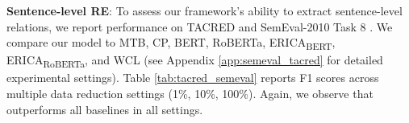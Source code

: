 \textbf{Sentence-level RE}: To assess our framework's ability to extract sentence-level relations, we report performance on TACRED \cite{zhang2017tacred} and SemEval-2010 Task 8 \cite{hendrickx-etal-2010-semeval}. We compare our model to MTB, CP, BERT, RoBERTa, ERICA\textsubscript{BERT}, ERICA\textsubscript{RoBERTa}, and WCL (see Appendix \ref{app:semeval_tacred} for detailed experimental settings). Table \ref{tab:tacred_semeval} reports F1 scores across multiple data reduction settings (1\%, 10\%, 100\%). Again, we observe that \our outperforms all baselines in all settings.